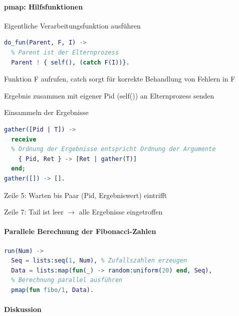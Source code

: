 \documentclass[10pt]{article}
\begin{document}
  \paragraph{pmap: Hilfsfunktionen}
  
  \color{orange} Eigentliche Verarbeitungsfunktion ausführen \color{black}
  \begin{lstlisting}[language=erlang]
do_fun(Parent, F, I) ->
  % Parent ist der Elternprozess
  Parent ! { self(), (catch F(I))}.
\end{lstlisting}
  \begin{itemize*}
    \item Funktion F aufrufen, catch sorgt für korrekte Behandlung von Fehlern in F
    \item Ergebnis zusammen mit eigener Pid (self()) an Elternprozess senden
  \end{itemize*}
  
  \color{orange} Einsammeln der Ergebnisse \color{black}
  \begin{lstlisting}[language=erlang]
gather([Pid | T]) ->
  receive
  % Ordnung der Ergebnisse entspricht Ordnung der Argumente
    { Pid, Ret } -> [Ret | gather(T)]
  end;
gather([]) -> [].
\end{lstlisting}
  \begin{itemize*}
    \item Zeile 5: Warten bis Paar (Pid, Ergebniswert) eintrifft
    \item Zeile 7: Tail ist leer $\rightarrow$ alle Ergebnisse eingetroffen
  \end{itemize*}
  
  \paragraph{Parallele Berechnung der Fibonacci-Zahlen}
  \begin{lstlisting}[language=erlang]
%Liste von Num Fibonacci Zahlen
run(Num) ->
  Seq = lists:seq(1, Num), % Zufallszahlen erzeugen
  Data = lists:map(fun(_) -> random:uniform(20) end, Seq),
  % Berechnung parallel ausführen
  pmap(fun fibo/1, Data).
\end{lstlisting}
  
  \paragraph{Diskussion}
  
\end{document}
